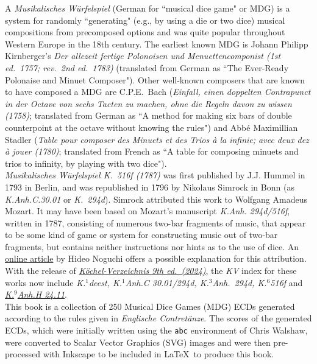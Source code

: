 \documentclass[letterpaper,x11names,svgnames,10pt]{article}
\begin{document}
A {\it Musikalisches W\"{u}rfelspiel} (German for ``musical dice game" or MDG) is a system for randomly ``generating" (e.g., by using a die or two dice) musical compositions from precomposed options and was quite popular throughout Western Europe in the 18th century.  The earliest known MDG is Johann Philipp Kirnberger's {\em Der allezeit fertige Polonoisen und Menuettencomponist (1st ed.\ 1757; rev.\ 2nd ed.\ 1783)} (translated from German as ``The Ever-Ready Polonaise and Minuet Composer").  Other well-known composers that are known to have composed a MDG are C.P.E.\ Bach ({\em Einfall, einen doppelten Contrapunct in der Octave von sechs Tacten zu machen, ohne die Regeln davon zu wissen (1758)}; translated from German as ``A method for making six bars of double counterpoint at the octave without knowing the rules") and Abb\'{e} Maximillian Stadler ({\em Table pour composer des Minuets et des Trios \`{a} la infinie; avec deux dez \`{a} jouer (1780)}; translated from French as ``A table for composing minuets and trios to infinity, by playing with two dice"). \\

{\it Musikalisches W\"{u}rfelspiel K.\ 516f (1787)} was first published by J.J. Hummel in 1793 in Berlin, and was republished in 1796 by Nikolaus Simrock in Bonn (as {\it K.Anh.C.30.01} or {\it K.\ 294d}).  Simrock attributed this work to Wolfgang Amadeus Mozart.  It may have been based on Mozart's manuscript {\it K.Anh. 294d/516f}, written in 1787, consisting of numerous two-bar fragments of music, that appear to be some kind of game or system for constructing music out of two-bar fragments, but contains neither instructions nor hints as to the use of dice.  An \href{(http://www.asahi-net.or.jp/\~rb5h-ngc/e/k516f.htm}{online article} by Hideo Noguchi offers a possible explanation for this attribution. With the release of \href{https://kv.mozarteum.at/en}{\it K\"{o}chel-Verzeichnis 9th ed.\ (2024)}, the {\it KV} index for these works now include {\it K.$^1$deest, K.$^1$Anh.C 30.01/294d, K.$^3$Anh.\ 294d, K.$^6$516f} and \href{https://kv.mozarteum.at/en/work/musikalisches-alphabet-6025}{\it K.$^9$Anh.H 24.11}. \\

This book is a collection of 250 Musical Dice Games (MDG) ECDs generated according to the rules given in {\it Englische Contret\"{a}nze}.  The scores of the generated ECDs, which were initially written using the \texttt{abc} environment of Chris Walshaw, were converted to Scalar Vector Graphics (SVG) images and were then pre-processed with Inkscape to be included in \LaTeX\ to produce this book.
\end{document}
